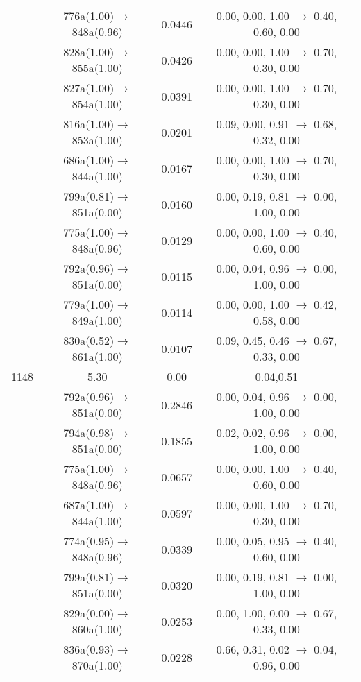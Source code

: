 \documentclass[10pt,a4paper]{article}
\begin{document}
\begin{longtable}{c|c|c|c}
 	& 776a(1.00)$\rightarrow$848a(0.96) &	 0.0446 &	 0.00, 0.00, 1.00 $\rightarrow$ 0.40, 0.60, 0.00 \\ 
 	& 828a(1.00)$\rightarrow$855a(1.00) &	 0.0426 &	 0.00, 0.00, 1.00 $\rightarrow$ 0.70, 0.30, 0.00 \\ 
 	& 827a(1.00)$\rightarrow$854a(1.00) &	 0.0391 &	 0.00, 0.00, 1.00 $\rightarrow$ 0.70, 0.30, 0.00 \\ 
 	& 816a(1.00)$\rightarrow$853a(1.00) &	 0.0201 &	 0.09, 0.00, 0.91 $\rightarrow$ 0.68, 0.32, 0.00 \\ 
 	& 686a(1.00)$\rightarrow$844a(1.00) &	 0.0167 &	 0.00, 0.00, 1.00 $\rightarrow$ 0.70, 0.30, 0.00 \\ 
 	& 799a(0.81)$\rightarrow$851a(0.00) &	 0.0160 &	 0.00, 0.19, 0.81 $\rightarrow$ 0.00, 1.00, 0.00 \\ 
 	& 775a(1.00)$\rightarrow$848a(0.96) &	 0.0129 &	 0.00, 0.00, 1.00 $\rightarrow$ 0.40, 0.60, 0.00 \\ 
 	& 792a(0.96)$\rightarrow$851a(0.00) &	 0.0115 &	 0.00, 0.04, 0.96 $\rightarrow$ 0.00, 1.00, 0.00 \\ 
 	& 779a(1.00)$\rightarrow$849a(1.00) &	 0.0114 &	 0.00, 0.00, 1.00 $\rightarrow$ 0.42, 0.58, 0.00 \\ 
 	& 830a(0.52)$\rightarrow$861a(1.00) &	 0.0107 &	 0.09, 0.45, 0.46 $\rightarrow$ 0.67, 0.33, 0.00 \\ 
 \hline1148 &	 5.30 &	 0.00 &	 0.04,0.51 \\ 
  	& 792a(0.96)$\rightarrow$851a(0.00) &	 0.2846 &	 0.00, 0.04, 0.96 $\rightarrow$ 0.00, 1.00, 0.00 \\ 
 	& 794a(0.98)$\rightarrow$851a(0.00) &	 0.1855 &	 0.02, 0.02, 0.96 $\rightarrow$ 0.00, 1.00, 0.00 \\ 
 	& 775a(1.00)$\rightarrow$848a(0.96) &	 0.0657 &	 0.00, 0.00, 1.00 $\rightarrow$ 0.40, 0.60, 0.00 \\ 
 	& 687a(1.00)$\rightarrow$844a(1.00) &	 0.0597 &	 0.00, 0.00, 1.00 $\rightarrow$ 0.70, 0.30, 0.00 \\ 
 	& 774a(0.95)$\rightarrow$848a(0.96) &	 0.0339 &	 0.00, 0.05, 0.95 $\rightarrow$ 0.40, 0.60, 0.00 \\ 
 	& 799a(0.81)$\rightarrow$851a(0.00) &	 0.0320 &	 0.00, 0.19, 0.81 $\rightarrow$ 0.00, 1.00, 0.00 \\ 
 	& 829a(0.00)$\rightarrow$860a(1.00) &	 0.0253 &	 0.00, 1.00, 0.00 $\rightarrow$ 0.67, 0.33, 0.00 \\ 
 	& 836a(0.93)$\rightarrow$870a(1.00) &	 0.0228 &	 0.66, 0.31, 0.02 $\rightarrow$ 0.04, 0.96, 0.00 \\ 

\end{longtable}
\end{document}
